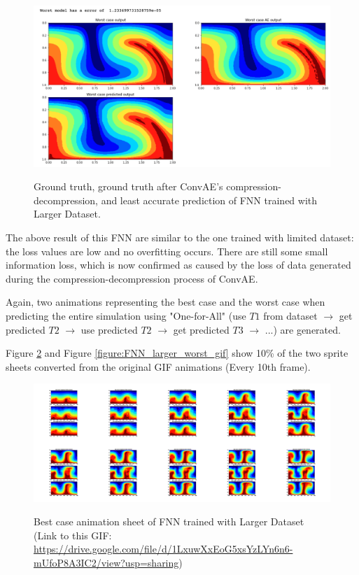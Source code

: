 \begin{figure}[H]
    \caption{Ground truth, ground truth after ConvAE's compression-decompression, and least accurate prediction of FNN trained with Larger Dataset.}
    \includegraphics[scale=0.5]{figures/mantle_convection_images/larger_dataset/FNN_Worst.png}
    \label{figure:FNN_larger_worst}
\end{figure}

The above result of this FNN are similar to the one trained with limited dataset: the loss values are low and no overfitting occurs. There are still some small information loss, which is now confirmed as caused by the loss of data generated during the compression-decompression process of ConvAE.

Again, two animations representing the best case and the worst case when predicting the entire simulation using "One-for-All" (use $T1$ from dataset $\rightarrow$ get predicted $T2$ $\rightarrow$ use predicted $T2$ $\rightarrow$ get predicted $T3$ $\rightarrow$ ...) are generated.

Figure \ref{figure:FNN_larger_best_gif} and Figure \ref{figure:FNN_larger_worst_gif} show 10\% of the two sprite sheets converted from the original GIF animations (Every 10th frame).

\begin{figure}[H]
    \centering
    \caption{Best case animation sheet of FNN trained with Larger Dataset (Link to this GIF: \url{https://drive.google.com/file/d/1LxuwXxEoG5xsYzLYn6n6-mUfoP8A3IC2/view?usp=sharing})}
    \includegraphics[scale=0.10]{figures/mantle_convection_images/larger_dataset/FNN_Best_GIF_sheet.png}
    \label{figure:FNN_larger_best_gif}
\end{figure}

